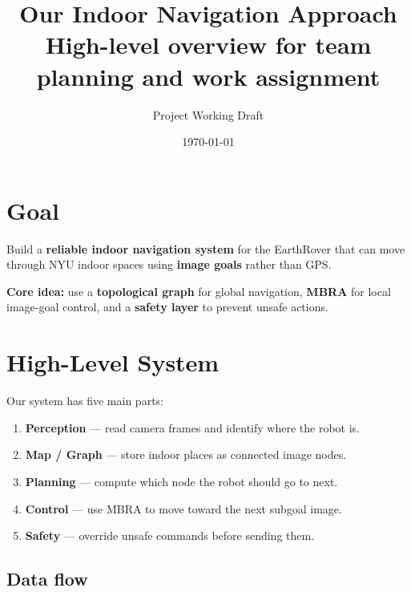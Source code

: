 \documentclass[11pt,a4paper]{article}
\title{Our Indoor Navigation Approach\\[0.3em]
\large High-level overview for team planning and work assignment}
\author{Project Working Draft}
\date{\today}
\begin{document}
\maketitle

\section{Goal}

Build a \textbf{reliable indoor navigation system} for the EarthRover that can
move through NYU indoor spaces using \textbf{image goals} rather than GPS.

\begin{mdframed}
\textbf{Core idea:} use a \textbf{topological graph} for global navigation,
\textbf{MBRA} for local image-goal control, and a \textbf{safety layer} to
prevent unsafe actions.
\end{mdframed}


\section{High-Level System}

Our system has five main parts:

\begin{enumerate}[nosep]
  \item \textbf{Perception} --- read camera frames and identify where the robot is.
  \item \textbf{Map / Graph} --- store indoor places as connected image nodes.
  \item \textbf{Planning} --- compute which node the robot should go to next.
  \item \textbf{Control} --- use MBRA to move toward the next subgoal image.
  \item \textbf{Safety} --- override unsafe commands before sending them.
\end{enumerate}

\subsection*{Data flow}

\begin{center}
\end{center}
\end{document}
